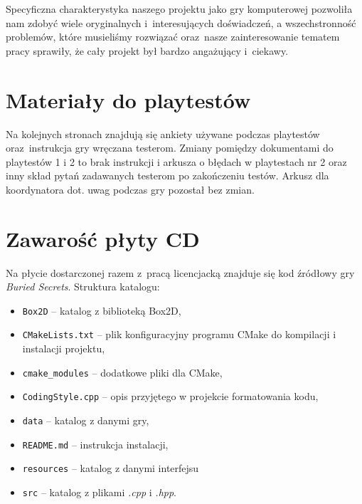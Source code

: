\documentclass[licencjacka]{pracamgr}
\begin{document}
  Specyficzna charakterystyka naszego projektu jako gry komputerowej pozwoliła nam zdobyć wiele oryginalnych
  i~interesujących doświadczeń, a wszechstronność problemów, które musieliśmy rozwiązać oraz~nasze zainteresowanie tematem
  pracy sprawiły, że cały projekt był bardzo angażujący i~ciekawy.


\appendix

\chapter{Materiały do playtestów}
  Na kolejnych stronach znajdują się ankiety używane podczas playtestów oraz~instrukcja gry wręczana testerom. Zmiany
  pomiędzy dokumentami do playtestów 1 i 2 to brak instrukcji i arkusza o błędach w playtestach nr 2 oraz inny skład pytań
  zadawanych testerom po zakończeniu testów. Arkusz dla koordynatora dot. uwag podczas gry pozostał bez zmian.

   
   
   

\chapter{Zawarość płyty CD}
  Na płycie dostarczonej razem z~pracą licencjacką znajduje się kod źródłowy gry \emph{Buried Secrets}. Struktura katalogu:
  \begin{itemize}
    \item \texttt{Box2D} -- katalog z biblioteką Box2D,
    \item \texttt{CMakeLists.txt} -- plik konfiguracyjny programu CMake do kompilacji i instalacji projektu,
    \item \texttt{cmake\_modules} -- dodatkowe pliki dla CMake,
    \item \texttt{CodingStyle.cpp} -- opis przyjętego w projekcie formatowania kodu,
    \item \texttt{data} -- katalog z danymi gry,
    \item \texttt{README.md} -- instrukcja instalacji,
    \item \texttt{resources} -- katalog z danymi interfejsu
    \item \texttt{src} -- katalog z plikami \emph{.cpp} i \emph{.hpp}.
  \end{itemize}
\end{document}
